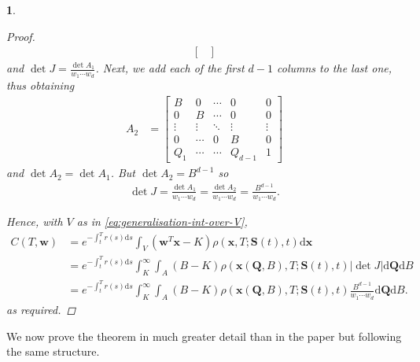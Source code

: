 \documentclass[english]{article}
\numberwithin{equation}{section}
\numberwithin{figure}{section}
\theoremstyle{bolddescit}
\theoremstyle{definition}
\theoremstyle{definition}
\theoremstyle{plain}
\newtheorem{lemma}[theorem]{\protect\lemmaname}
\theoremstyle{plain}
\theoremstyle{bolddesc}
\theoremstyle{plain}
\theoremstyle{remark}
\providecommand{\lemmaname}{Lemma}
\begin{document}
\begin{lemma}
\begin{proof}
\begin{align*}
\begin{bmatrix}
      \end{bmatrix}
    \end{align*}
    and $\det J = \frac{\det A_1}{w_1 \cdots w_d}$. Next, we add each of the first $d-1$ columns to the last one, thus obtaining
    \begin{align*}
      A_2 &= \begin{bmatrix}
        B & 0 & \cdots & 0 & 0\\
        0 & B & \cdots & 0 & 0\\
        \vdots & \vdots & \ddots & \vdots & \vdots\\
        0 & \cdots & 0 & B & 0\\
        Q_1 & \cdots & \cdots & Q_{d-1} & 1
      \end{bmatrix}
    \end{align*}
    and $\det A_2 = \det A_1$. But $\det A_2 = B^{d-1}$ so
    \begin{align*}
      \det J = \frac{\det A_1}{w_1 \cdots w_d} = \frac{\det A_2}{w_1 \cdots w_d} = \frac{B^{d-1}}{w_1 \cdots w_d}.
    \end{align*}

    Hence, with $V$ as in \eqref{eq:generalisation-int-over-V},
    \begin{align*}
      C(T,\mathbf{w})
      &= e^{-\int_t^T r(s) \mathrm{d}s} \int_V \left(\mathbf{w}^T\mathbf{x} - K\right) \rho(\mathbf{x},T;\mathbf{S}(t),t) \mathrm{d}\mathbf{x}\\
      &= e^{-\int_t^T r(s) \mathrm{d}s} \int_K^\infty \int_A \left(B - K\right) \rho(\mathbf{x}(\mathbf{Q},B),T;\mathbf{S}(t),t) |\det J| \mathrm{d}\mathbf{Q} \mathrm{d}B\\
      &= e^{-\int_t^T r(s) \mathrm{d}s} \int_K^\infty \int_A \left(B - K\right) \rho(\mathbf{x}(\mathbf{Q},B),T;\mathbf{S}(t),t) \frac{B^{d-1}}{w_1 \cdots w_d} \mathrm{d}\mathbf{Q} \mathrm{d}B.
    \end{align*}
    as required.
  \end{proof}
\end{lemma}

We now prove the theorem in much greater detail than in the paper but following the same structure.
\end{document}
